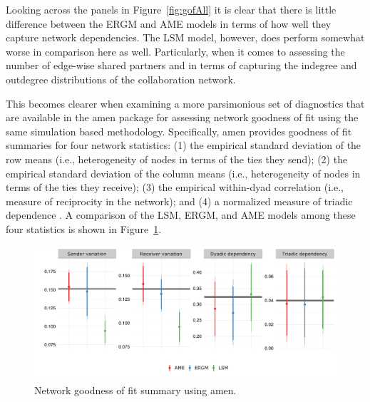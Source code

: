 \documentclass[12pt,pdflatex]{elsarticle}
\newcommand{\pkg}[1]{{\fontseries{b}\selectfont #1}}
\begin{document}
Looking across the panels in Figure~\ref{fig:gofAll} it is clear that there is little difference between the ERGM and AME models in terms of how well they capture network dependencies. The LSM model, however, does perform somewhat worse in comparison here as well. Particularly, when it comes to assessing the number of edge-wise shared partners and in terms of capturing the indegree and outdegree distributions of the collaboration network. 

This becomes clearer when examining a more parsimonious set of diagnostics that are available in the \pkg{amen} package for assessing network goodness of fit using the same simulation based methodology. Specifically, \pkg{amen} provides goodness of fit summaries for four network statistics: (1) the empirical standard deviation of the row means (i.e., heterogeneity of nodes in terms of the ties they send); (2) the empirical standard deviation of the column means (i.e., heterogeneity of nodes in terms of the ties they receive); (3) the empirical within-dyad correlation (i.e., measure of reciprocity in the network); and (4) a normalized measure of triadic dependence \citep{hoff:etal:2015}. A comparison of the LSM, ERGM, and AME models among these four statistics is shown in Figure~\ref{fig:ergmAmePerf}.

\begin{figure}[ht]
	\centering
	\includegraphics[width=1\textwidth]{netPerfCoef}
	\caption{Network goodness of fit summary using \pkg{amen}.}
	\label{fig:ergmAmePerf}
\end{figure}
\FloatBarrier
\end{document}
